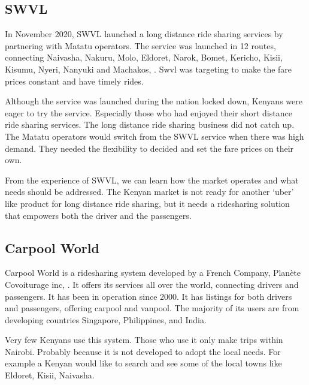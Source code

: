 \subsection{SWVL}
In November 2020, SWVL launched a long distance ride sharing services by partnering with Matatu operators. The service was launched  in 12 routes, connecting Naivasha, Nakuru, Molo, Eldoret, Narok, Bomet, Kericho, Kisii, Kisumu, Nyeri, Nanyuki and Machakos, \citep{alvin2020}. Swvl was targeting to make the fare prices constant and have timely rides.

Although the service was launched during the nation locked down, Kenyans were eager to try the service. Especially those who had enjoyed their short distance ride sharing services. The long distance ride sharing business did not catch up. The Matatu operators would switch from the SWVL service when there was high demand. They needed the flexibility to decided and set the fare prices on their own.

From the experience of SWVL, we can learn how the market operates and what needs should be addressed. The Kenyan market is not ready for another `uber' like product for long distance ride sharing, but it needs a ridesharing solution that empowers both the driver and the passengers.

\subsection{Carpool World}

Carpool World is a ridesharing system developed by a French Company, Planète Covoiturage inc, \citep{carpoolworld}. It offers its services all over the world, connecting drivers and passengers. It has been in operation since 2000. It has listings for both drivers and passengers, offering carpool and vanpool. The majority of its users are from developing countries Singapore, Philippines, and India.

Very few Kenyans use this system. Those who use it only make trips within Nairobi. Probably because it is not developed to adopt the local needs. For example a Kenyan would like to search and see some of the local towns like Eldoret, Kisii, Naivasha.

